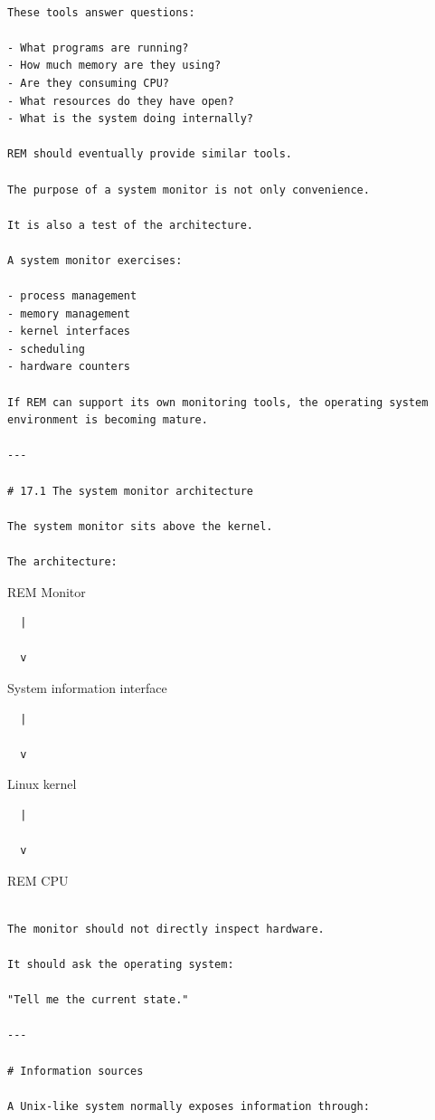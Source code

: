 \documentclass[
  oneside,
  openany]{book}
\begin{document}
\begin{verbatim}

These tools answer questions:

- What programs are running?
- How much memory are they using?
- Are they consuming CPU?
- What resources do they have open?
- What is the system doing internally?

REM should eventually provide similar tools.

The purpose of a system monitor is not only convenience.

It is also a test of the architecture.

A system monitor exercises:

- process management
- memory management
- kernel interfaces
- scheduling
- hardware counters

If REM can support its own monitoring tools, the operating system environment is becoming mature.

---

# 17.1 The system monitor architecture

The system monitor sits above the kernel.

The architecture:
\end{verbatim}

REM Monitor

\begin{verbatim}
  |

  v
\end{verbatim}

System information interface

\begin{verbatim}
  |

  v
\end{verbatim}

Linux kernel

\begin{verbatim}
  |

  v
\end{verbatim}

REM CPU

\begin{verbatim}

The monitor should not directly inspect hardware.

It should ask the operating system:

"Tell me the current state."

---

# Information sources

A Unix-like system normally exposes information through:
\end{verbatim}
\end{document}
